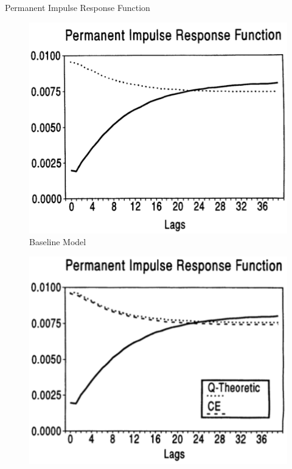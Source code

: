 \documentclass[10pt]{beamer}
\begin{document}
\begin{frame}{Permanent Impulse Response Function} 
\begin{minipage}{0.33\textwidth}
\begin{figure}
  \centering
  \includegraphics[width=\linewidth]{Base_per_IRF.png}
  \caption{Baseline Model}
\end{figure}
\end{minipage}%
\begin{minipage}{0.33\textwidth}
\begin{figure}
  \centering
  \includegraphics[width=\linewidth]{K_per_IRF.png}

\end{figure}
\end{minipage}
\end{frame}
\end{document}
